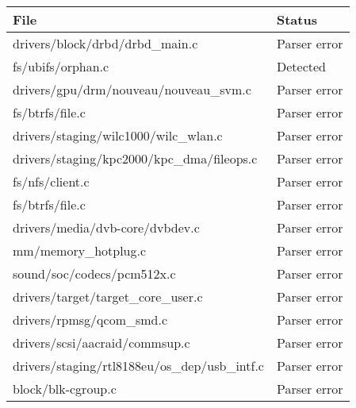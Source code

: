 \documentclass[
  8pt,
]{article}
\begin{document}
\begin{longtable}[]{@{}ll@{}}
\toprule
File & Status\tabularnewline
\midrule
\endhead
drivers/block/drbd/drbd\_main.c & Parser error\tabularnewline
fs/ubifs/orphan.c & Detected\tabularnewline
drivers/gpu/drm/nouveau/nouveau\_svm.c & Parser error\tabularnewline
fs/btrfs/file.c & Parser error\tabularnewline
drivers/staging/wilc1000/wilc\_wlan.c & Parser error\tabularnewline
drivers/staging/kpc2000/kpc\_dma/fileops.c & Parser error\tabularnewline
fs/nfs/client.c & Parser error\tabularnewline
fs/btrfs/file.c & Parser error\tabularnewline
drivers/media/dvb-core/dvbdev.c & Parser error\tabularnewline
mm/memory\_hotplug.c & Parser error\tabularnewline
sound/soc/codecs/pcm512x.c & Parser error\tabularnewline
drivers/target/target\_core\_user.c & Parser error\tabularnewline
drivers/rpmsg/qcom\_smd.c & Parser error\tabularnewline
drivers/scsi/aacraid/commsup.c & Parser error\tabularnewline
drivers/staging/rtl8188eu/os\_dep/usb\_intf.c & Parser
error\tabularnewline
block/blk-cgroup.c & Parser error\tabularnewline
\bottomrule
\end{longtable}
\end{document}
